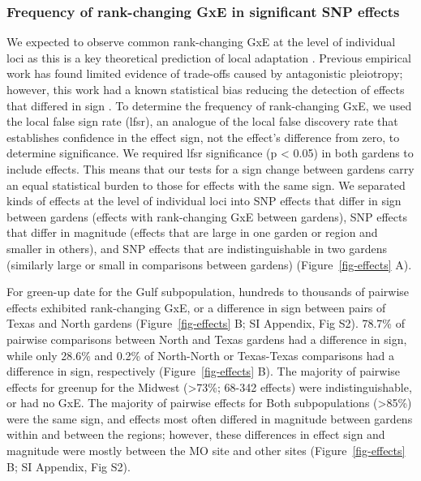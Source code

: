 \documentclass[
  9pt,
  twocolumn,
  twoside]{simple-article}%
\begin{document}
\subsubsection{Frequency of rank-changing GxE in significant SNP
effects}\label{frequency-of-rank-changing-gxe-in-significant-snp-effects}

We expected to observe common rank-changing GxE at the level of
individual loci as this is a key theoretical prediction of local
adaptation
\citep{felsenstein1976theoretical, levene1953genetic, kawecki2004conceptual, hedrick1986genetic}.
Previous empirical work has found limited evidence of trade-offs caused
by antagonistic pleiotropy; however, this work had a known statistical
bias reducing the detection of effects that differed in sign
\citep{wadgymar2017identifying, des2013genotype, millet2016}. To
determine the frequency of rank-changing GxE, we used the local false
sign rate (lfsr), an analogue of the local false discovery rate that
establishes confidence in the effect sign, not the effect's difference
from zero, to determine significance. We required lfsr significance (p
\textless{} 0.05) in both gardens to include effects. This means that
our tests for a sign change between gardens carry an equal statistical
burden to those for effects with the same sign. We separated kinds of
effects at the level of individual loci into SNP effects that differ in
sign between gardens (effects with rank-changing GxE between gardens),
SNP effects that differ in magnitude (effects that are large in one
garden or region and smaller in others), and SNP effects that are
indistinguishable in two gardens (similarly large or small in
comparisons between gardens) (Figure~\ref{fig-effects} A).

For green-up date for the Gulf subpopulation, hundreds to thousands of
pairwise effects exhibited rank-changing GxE, or a difference in sign
between pairs of Texas and North gardens (Figure~\ref{fig-effects} B; SI
Appendix, Fig S2). 78.7\% of pairwise comparisons between North and
Texas gardens had a difference in sign, while only 28.6\% and 0.2\% of
North-North or Texas-Texas comparisons had a difference in sign,
respectively (Figure~\ref{fig-effects} B). The majority of pairwise
effects for greenup for the Midwest (\textgreater73\%; 68-342 effects)
were indistinguishable, or had no GxE. The majority of pairwise effects
for Both subpopulations (\textgreater85\%) were the same sign, and
effects most often differed in magnitude between gardens within and
between the regions; however, these differences in effect sign and
magnitude were mostly between the MO site and other sites
(Figure~\ref{fig-effects} B; SI Appendix, Fig S2).
\end{document}

